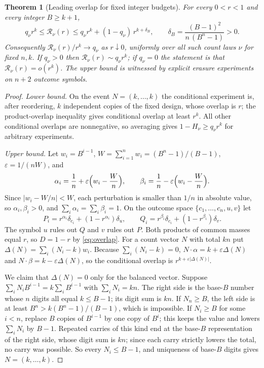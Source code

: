 \documentclass[11pt,a4paper]{article}
\newtheorem{theorem}{Theorem}[section]
\theoremstyle{definition}\newtheorem{definition}[theorem]{Definition}
\theoremstyle{remark}\newtheorem{remark}[theorem]{Remark}
\begin{document}
\begin{theorem}[Leading overlap for fixed integer budgets]\label{thm:strongall}
For every $0<r<1$ and every integer $B\ge k+1$,
\begin{equation}\label{eq:strongsandwich}
q_\nu r^k\le\mathcal R_\nu(r)
\le q_\nu r^k+(1-q_\nu)\,r^{k+\delta_B},\qquad
\delta_B=\frac{(B-1)^2}{n\,(B^n-1)}>0 .
\end{equation}
Consequently $\mathcal R_\nu(r)/r^k\to q_\nu$ as $r\downarrow0$, uniformly over all such count laws $\nu$ for fixed $n,k$. If $q_\nu>0$ then $\mathcal R_\nu(r)\sim q_\nu r^k$; if $q_\nu=0$ the statement is that $\mathcal R_\nu(r)=o(r^k)$. The upper bound is witnessed by explicit erasure experiments on $n+2$ outcome symbols.
\end{theorem}
\begin{proof}
\emph{Lower bound.} On the event $N=(k,\ldots,k)$ the conditional experiment is, after reordering, $k$ independent copies of the fixed design, whose overlap is $r$; the product-overlap inequality gives conditional overlap at least $r^k$. All other conditional overlaps are nonnegative, so averaging gives $1-H_\nu\ge q_\nu r^k$ for arbitrary experiments.

\emph{Upper bound.} Let $w_i=B^{i-1}$, $W=\sum_{i=1}^nw_i=(B^n-1)/(B-1)$, $\varepsilon=1/(nW)$, and
\[
\alpha_i=\frac1n+\varepsilon\Bigl(w_i-\frac Wn\Bigr),\qquad
\beta_i=\frac1n-\varepsilon\Bigl(w_i-\frac Wn\Bigr).
\]
Since $|w_i-W/n|<W$, each perturbation is smaller than $1/n$ in absolute value, so $\alpha_i,\beta_i>0$, and $\sum_i\alpha_i=\sum_i\beta_i=1$. On the outcome space $\{c_1,\ldots,c_n,u,v\}$ let
\begin{equation}\label{eq:radixfamily}
P_i=r^{\alpha_i}\delta_{c_i}+(1-r^{\alpha_i})\delta_u,
\qquad
Q_i=r^{\beta_i}\delta_{c_i}+(1-r^{\beta_i})\delta_v.
\end{equation}
The symbol $u$ rules out $Q$ and $v$ rules out $P$. Both products of common masses equal $r$, so $D=1-r$ by \eqref{eq:overlap}. For a count vector $N$ with total $kn$ put $\Delta(N)=\sum_i(N_i-k)w_i$. Because $\sum_i(N_i-k)=0$, $N\cdot\alpha=k+\varepsilon\Delta(N)$ and $N\cdot\beta=k-\varepsilon\Delta(N)$, so the conditional overlap is $r^{k+\varepsilon|\Delta(N)|}$.

We claim that $\Delta(N)=0$ only for the balanced vector. Suppose $\sum_iN_iB^{i-1}=k\sum_iB^{i-1}$ with $\sum_iN_i=kn$. The right side is the base-$B$ number whose $n$ digits all equal $k\le B-1$; its digit sum is $kn$. If $N_n\ge B$, the left side is at least $B^n>k(B^n-1)/(B-1)$, which is impossible. If $N_i\ge B$ for some $i<n$, replace $B$ copies of $B^{i-1}$ by one copy of $B^i$; this keeps the value and lowers $\sum_iN_i$ by $B-1$. Repeated carries of this kind end at the base-$B$ representation of the right side, whose digit sum is $kn$; since each carry strictly lowers the total, no carry was possible. So every $N_i\le B-1$, and uniqueness of base-$B$ digits gives $N=(k,\ldots,k)$.


\end{proof}
\end{document}

